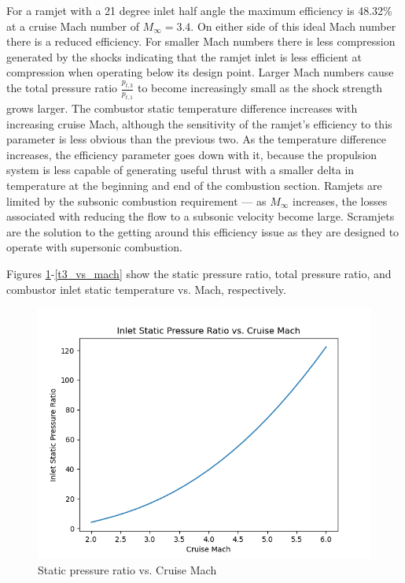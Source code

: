 \documentclass[../main.tex]{subfiles}
\begin{document}
\discussion{}
For a ramjet with a 21 degree inlet half angle the maximum efficiency is 48.32\% at a cruise Mach number of \(M_\infty=3.4\).
On either side of this ideal Mach number there is a reduced efficiency.
For smaller Mach numbers there is less compression generated by the shocks indicating that the ramjet inlet is less efficient at compression when operating below its design point. 
Larger Mach numbers cause the total pressure ratio \(\frac{p_{t,3}}{p_{t,1}}\) to become increasingly small as the shock strength grows larger.
The combustor static temperature difference increases with increasing cruise Mach, although the sensitivity of the ramjet's efficiency to this parameter is less obvious than the previous two.
As the temperature difference increases, the efficiency parameter goes down with it, because the propulsion system is less capable of generating useful thrust with a smaller delta in temperature at the beginning and end of the combustion section.
Ramjets are limited by the subsonic combustion requirement --- as \(M_\infty\) increases, the losses associated with reducing the flow to a subsonic velocity become large.
Scramjets are the solution to the getting around this efficiency issue as they are designed to operate with supersonic combustion.

Figures \ref{pr_vs_mach}-\ref{t3_vs_mach} show the static pressure ratio, total pressure ratio, and combustor inlet static temperature vs. Mach, respectively. 

\begin{figure}[h!]
    \centering
    \includegraphics[scale=0.6]{../../images/problem_2/pr_vs_mach.png}
    \caption{Static pressure ratio vs. Cruise Mach}
    \label{pr_vs_mach}
\end{figure}
\end{document}
